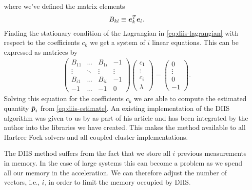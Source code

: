             where we've defined the matrix elements
            \begin{align}
                B_{kl} \equiv \boldsymbol{e}_k^T\boldsymbol{e}_l.
            \end{align}
            Finding the stationary condition of the Lagrangian in
            \autoref{eq:diis-lagrangian} with respect to the coefficients $c_k$
            we get a system of $i$ linear equations.
            This can be expressed as matrices by
            \begin{align}
                \begin{pmatrix}
                    B_{11} & \dots & B_{1i} & -1 \\
                    \vdots & \ddots & \vdots & \vdots \\
                    B_{i1} & \dots & B_{ii} & -1 \\
                    -1 & \dots & -1 & 0
                \end{pmatrix}
                \begin{pmatrix}
                    c_1 \\
                    \vdots \\
                    c_i \\
                    \lambda
                \end{pmatrix}
                = \begin{pmatrix}
                    0 \\
                    \vdots \\
                    0 \\
                    -1
                \end{pmatrix}.
            \end{align}
            Solving this equation for the coefficients $c_k$ we are able to
            compute the estimated quantity $\bar{\boldsymbol{p}}_i$ from
            \autoref{eq:diis-estimate}.
            An existing implementation of the DIIS algorithm was given to us by
            \citeauthor{rolf-nocc} as part of his article 
            \cite{rolf-nocc} and has been integrated by the author into the
            libraries we have created.
            This makes the method available to all Hartree-Fock solvers and all
            coupled-cluster implementations.

            The DIIS method suffers from the fact that we store all $i$ previous
            measurements in memory.
            In the case of large systems this can become a problem as we spend
            all our memory in the acceleration.
            We can therefore adjust the number of vectors, i.e., $i$, in order
            to limit the memory occupied by DIIS.

